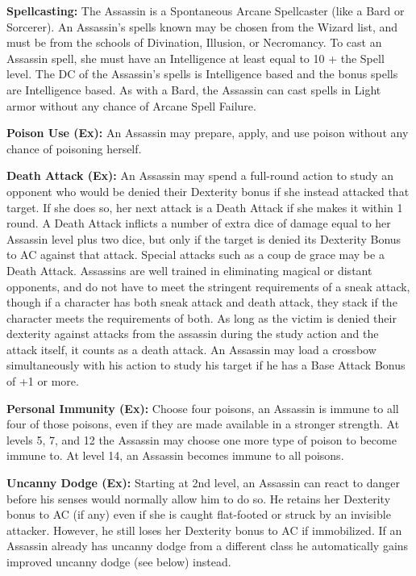 \textbf{Spellcasting:} The Assassin is a Spontaneous Arcane Spellcaster (like a Bard or Sorcerer). An Assassin's spells known may be chosen from the Wizard list, and must be from the schools of Divination, Illusion, or Necromancy. To cast an Assassin spell, she must have an Intelligence at least equal to 10 + the Spell level. The DC of the Assassin's spells is Intelligence based and the bonus spells are Intelligence based. As with a Bard, the Assassin can cast spells in Light armor without any chance of Arcane Spell Failure.

\textbf{Poison Use (Ex):} An Assassin may prepare, apply, and use poison without any chance of poisoning herself.

\textbf{Death Attack (Ex):} An Assassin may spend a full-round action to study an opponent who would be denied their Dexterity bonus if she instead attacked that target. If she does so, her next attack is a Death Attack if she makes it within 1 round. A Death Attack inflicts a number of extra dice of damage equal to her Assassin level plus two dice, but only if the target is denied its Dexterity Bonus to AC against that attack. Special attacks such as a coup de grace may be a Death Attack. Assassins are well trained in eliminating magical or distant opponents, and do not have to meet the stringent requirements of a sneak attack, though if a character has both sneak attack and death attack, they stack if the character meets the requirements of both. As long as the victim is denied their dexterity against attacks from the assassin during the study action and the attack itself, it counts as a death attack. An Assassin may load a crossbow simultaneously with his action to study his target if he has a Base Attack Bonus of +1 or more.

\textbf{Personal Immunity (Ex):} Choose four poisons, an Assassin is immune to all four of those poisons, even if they are made available in a stronger strength. At levels 5, 7, and 12 the Assassin may choose one more type of poison to become immune to. At level 14, an Assassin becomes immune to all poisons.

\textbf{Uncanny Dodge (Ex):} Starting at 2nd level, an Assassin can react to danger before his senses would normally allow him to do so. He retains her Dexterity bonus to AC (if any) even if she is caught flat-footed or struck by an invisible attacker. However, he still loses her Dexterity bonus to AC if immobilized. If an Assassin already has uncanny dodge from a different class he automatically gains improved uncanny dodge (see below) instead.

